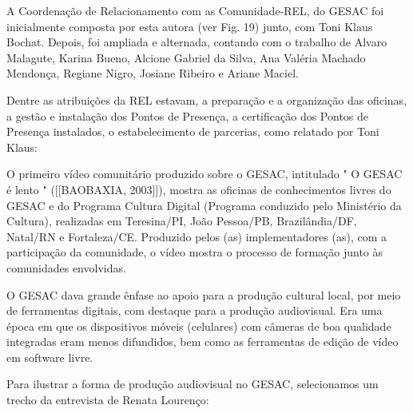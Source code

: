 A Coordenação de Relacionamento com as Comunidade-REL, do GESAC foi inicialmente composta por esta autora (ver Fig. 19) junto, com Toni Klaus Bochat. Depois, foi ampliada e alternada, contando com o trabalho de Alvaro Malagute, Karina Bueno, Alcione Gabriel da Silva, Ana Valéria Machado Mendonça, Regiane Nigro, Josiane Ribeiro e Ariane Maciel.

Dentre as atribuições da REL estavam,  a preparação e a organização das oficinas, a gestão e instalação dos Pontos de Presença, a certificação dos Pontos de Presença instalados, o estabelecimento de parcerias, como relatado por Toni Klaus:


\noindent\begin{center}\mbox{\centering{}}\end{center}


O primeiro vídeo comunitário produzido sobre o GESAC, intitulado " O GESAC é lento "  ([[BAOBAXIA, 2003]]),  mostra as oficinas de conhecimentos livres do GESAC e do Programa Cultura Digital (Programa conduzido pelo Ministério da Cultura), realizadas em Teresina/PI, João Pessoa/PB, Brazilândia/DF, Natal/RN e Fortaleza/CE. Produzido pelos (as) implementadores (as), com a participação da comunidade, o vídeo mostra o processo de formação junto às comunidades envolvidas.

O GESAC dava grande ênfase ao apoio para a produção cultural local, por meio de ferramentas digitais, com destaque para a produção audiovisual. Era uma época em que os dispositivos móveis (celulares) com câmeras de boa qualidade integradas eram menos difundidos, bem como as ferramentas de edição de vídeo em software livre.

Para ilustrar a forma de produção audiovisual no GESAC, selecionamos um trecho da entrevista de Renata Lourenço:


\noindent\begin{center}\mbox{\centering{}}\end{center}


